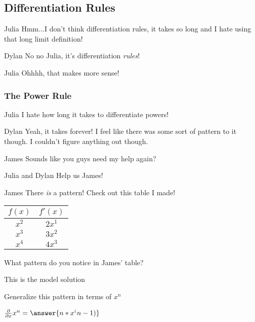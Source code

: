 \documentclass{ximera}
\begin{document}
\subsection{Differentiation Rules}
\begin{dialogue}
\item[Julia] Hmm...I don't think differentiation rules, it takes so long and I hate using that long limit definition!
\item[Dylan] No no Julia, it's differentiation \textit{rules}!
\item[Julia] Ohhhh, that makes more sense!

\end{dialogue}
\subsubsection{The Power Rule}
\begin{dialogue}
\item[Julia] I hate how long it takes to differentiate powers!
\item[Dylan] Yeah, it takes forever! I feel like there was some sort of pattern to it though. I couldn't figure anything out though.
\item[James] Sounds like you guys need my help again?
\item[Julia and Dylan] Help us James!
\item[James] There \textit{is} a pattern! Check out this table I made!
\begin{center}
\begin{tabular}{c|c}
$f(x)$ & $f'(x)$ \\
\hline
$x^2$ & $2x^1$ \\
$x^3$ & $3x^2$ \\
$x^4$ & $4x^3$ 
\end{tabular}
\end{center}
\end{dialogue}
\begin{question}
What pattern do you notice in James' table?
\begin{freeResponse}
This is the model solution %
\end{freeResponse}
\end{question}
\begin{question}
Generalize this pattern in terms of $x^n$

$ \frac{\partial}{\partial x} x^n =  \answer{n*x^(n-1)}$
\end{question}
\end{document}

